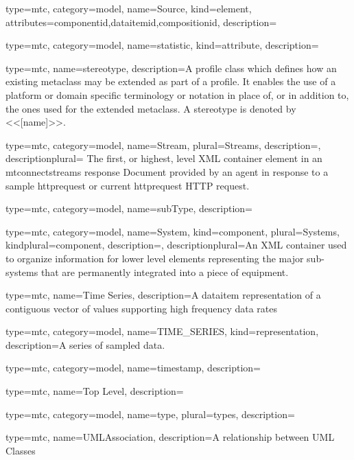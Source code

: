 {
  type=mtc,
  category=model,
  name={Source},
  kind={element},
  attributes={\gls{componentid},\gls{dataitemid},\gls{compositionid}},
  description={}
}


{
  type=mtc,
  category=model,
  name={statistic},
  kind={attribute},
  description={}
}


{
  type=mtc,
  name=stereotype,
  description={A profile class which defines how an existing metaclass may be extended as part of a profile. It enables the use of a platform or domain specific terminology or notation in place of, or in addition to, the ones used for the extended metaclass. A stereotype is denoted by <<[name]>>.}
}


{
  type=mtc,
  category=model,
  name={Stream},
  plural={Streams},
  description={},
  descriptionplural= {The first, or highest, level XML container element in an \glspl{mtconnectstream} \gls{response} Document provided by an \gls{agent} in response to a \gls{sample httprequest} or \gls{current httprequest} HTTP \gls{request}.}
}


{
  type=mtc,
  category=model,
  name={subType},
  description={}
}


{
  type=mtc,
  category=model,
  name={System},
  kind={component},
  plural={Systems},
  kindplural={component},
  description={},
  descriptionplural={An XML container used to organize information for \gls{lower level} elements representing the major sub-systems that are permanently integrated into a piece of equipment.}
}


{
  type=mtc,
  name={Time Series},
  description={A \gls{dataitem} representation of a contiguous vector of values supporting high frequency data rates}
}


{
  type=mtc,
  category=model,
  name={TIME\_SERIES},
  kind={representation},
  description={A series of sampled data. }
}


{
  type=mtc,
  category=model,
  name={timestamp},
  description={}
}


{
  type=mtc,
  name={Top Level},
  description={}
}


{
  type=mtc,
  category=model,
  name={type},
  plural={types},
  description={}
}


{
  type=mtc,
  name=UMLAssociation,
  description={A relationship between UML Classes}
}


